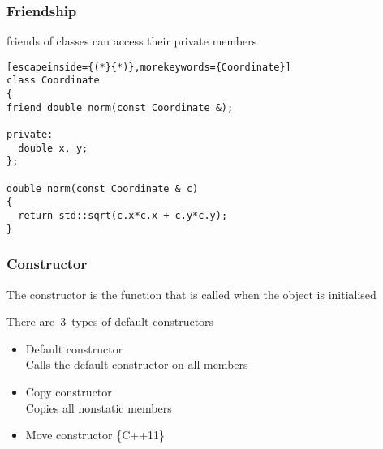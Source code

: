 \documentclass[14pt,a4paper,dvipsnames,usenames]{beamer}
\begin{document}
\begin{frame}[fragile]
  \frametitle{Friendship}

  {\color{FeebleWeek}friend}s of classes can access their private members

  \vspace{.5em}
  \begin{lstlisting}[escapeinside={(*}{*)},morekeywords={Coordinate}]
class Coordinate
{
friend double norm(const Coordinate &); 

private:
  double x, y;
};

double norm(const Coordinate & c) 
{
  return std::sqrt(c.x*c.x + c.y*c.y);
} 
  \end{lstlisting}
  
\end{frame}

\begin{frame}
  \frametitle{Constructor}

  The constructor is the function that is called when the object is initialised

  \vspace{1em}
  There are \,{\large\color{Tropiteal}3}\, types of default constructors
  
  \vspace{.5em}
  \begin{itemize}
    \setlength\itemsep{.5em}
    \item Default constructor\\
      { Calls the default constructor on all members}
    \item Copy constructor\\
      { Copies all nonstatic members}
    \item Move constructor {\footnotesize\color{Tropiteal}\{C++11\}}
  \end{itemize}
  
\end{frame}
\end{document}
